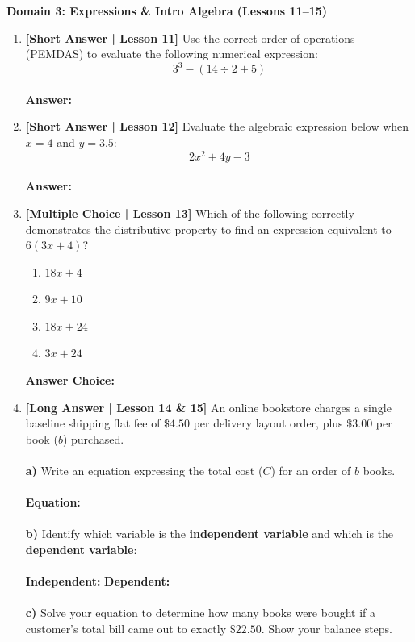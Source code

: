 \documentclass[12pt, letterpaper, fleqn]{article}
\newcommand{\blankshorter}{\underline{\hspace{2.0cm}}}
\newcommand{\blanklong}{\underline{\hspace{6.5cm}}}
\begin{document}
\vspace{0.5cm}

\begin{tcolorbox}[colback=white, colframe=black, arc=2mm]
    \textbf{Domain 3: Expressions \& Intro Algebra (Lessons 11--15)}
\end{tcolorbox}

\begin{enumerate}[leftmargin=0.6cm, itemsep=1.2cm, start=9]

\item \textbf{[Short Answer | Lesson 11]} Use the correct order of operations (PEMDAS) to evaluate the following numerical expression:
$$3^3 - (14 \div 2 + 5)$$
\vspace{1.5cm} \\
\textbf{Answer:} \blanklong

\item \textbf{[Short Answer | Lesson 12]} Evaluate the algebraic expression below when $x = 4$ and $y = 3.5$:
$$2x^2 + 4y - 3$$
\vspace{1.5cm} \\
\textbf{Answer:} \blanklong

\item \textbf{[Multiple Choice | Lesson 13]} Which of the following correctly demonstrates the distributive property to find an expression equivalent to $6(3x + 4)$?
\begin{enumerate}[label=\Alph*)]
    \item $18x + 4$
    \item $9x + 10$
    \item $18x + 24$
    \item $3x + 24$
\end{enumerate}
\textbf{Answer Choice:} \blankshorter

\item \textbf{[Long Answer | Lesson 14 \& 15]} An online bookstore charges a single baseline shipping flat fee of $\$4.50$ per delivery layout order, plus $\$3.00$ per book ($b$) purchased. 
\\ \\
\textbf{a)} Write an equation expressing the total cost ($C$) for an order of $b$ books.
\\ \\
\textbf{Equation:} \blanklong \\ \\
\textbf{b)} Identify which variable is the \textbf{independent variable} and which is the \textbf{dependent variable}:
\\ \\
\textbf{Independent:} \blanklong \quad \textbf{Dependent:} \blanklong \\ \\
\textbf{c)} Solve your equation to determine how many books were bought if a customer's total bill came out to exactly $\$22.50$. Show your balance steps.

\vspace{3cm}

\end{enumerate}
\end{document}
